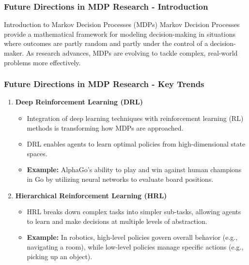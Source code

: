 \documentclass[aspectratio=169]{beamer}
\begin{document}
\begin{frame}[fragile]
    \frametitle{Future Directions in MDP Research - Introduction}
    \begin{block}{Introduction to Markov Decision Processes (MDPs)}
        Markov Decision Processes provide a mathematical framework for modeling decision-making in situations where outcomes are partly random and partly under the control of a decision-maker. 
        As research advances, MDPs are evolving to tackle complex, real-world problems more effectively.
    \end{block}
\end{frame}

\begin{frame}[fragile]
    \frametitle{Future Directions in MDP Research - Key Trends}
    \begin{enumerate}
        \item \textbf{Deep Reinforcement Learning (DRL)}  
            \begin{itemize}  
                \item Integration of deep learning techniques with reinforcement learning (RL) methods is transforming how MDPs are approached.
                \item DRL enables agents to learn optimal policies from high-dimensional state spaces.
                \item \textbf{Example:} AlphaGo’s ability to play and win against human champions in Go by utilizing neural networks to evaluate board positions.
            \end{itemize}
        
        \item \textbf{Hierarchical Reinforcement Learning (HRL)}  
            \begin{itemize}
                \item HRL breaks down complex tasks into simpler sub-tasks, allowing agents to learn and make decisions at multiple levels of abstraction.
                \item \textbf{Example:} In robotics, high-level policies govern overall behavior (e.g., navigating a room), while low-level policies manage specific actions (e.g., picking up an object).
            \end{itemize}
    \end{enumerate}
\end{frame}
\end{document}
